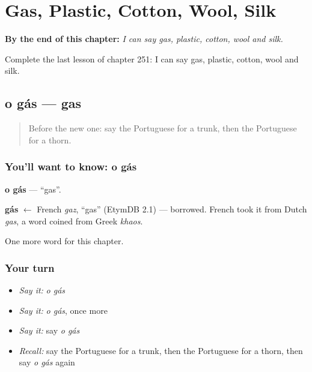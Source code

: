 
\chapter{Gas, Plastic, Cotton, Wool, Silk}
\label{ch:pt-gas-plastic-cotton-wool-silk}

\begin{chapteropening}
\textbf{By the end of this chapter:} \emph{I can say gas, plastic, cotton, wool and silk.}

Complete the last lesson of chapter 251: I can say gas, plastic, cotton, wool and silk.
\end{chapteropening}

\section[o gás]{o gás — gas}

\label{lesson:PT-C251-gas}



\begin{quote}
Before the new one: say the Portuguese for a trunk, then the Portuguese for a thorn.
\end{quote}

\subsection*{You'll want to know: o gás}
\textbf{o gás} — \textquotedblleft{}gas\textquotedblright{}.

\begin{cousinweb}
\textbf{gás} $\leftarrow$ French \emph{gaz}, \textquotedblleft{}gas\textquotedblright{} (EtymDB 2.1) — borrowed. French took it from Dutch \emph{gas}, a word coined from Greek \emph{khaos}.
\end{cousinweb}

\begin{grammarlens}[title={What you've built}]
One more word for this chapter.
\end{grammarlens}

\subsection*{Your turn}
\begin{itemize}
\raggedright
  \item \emph{Say it:} \emph{o gás}
  \item \emph{Say it:} \emph{o gás}, once more
  \item \emph{Say it:} say \emph{o gás}
  \item \emph{Recall:} say the Portuguese for a trunk, then the Portuguese for a thorn, then say \emph{o gás} again
\end{itemize}

